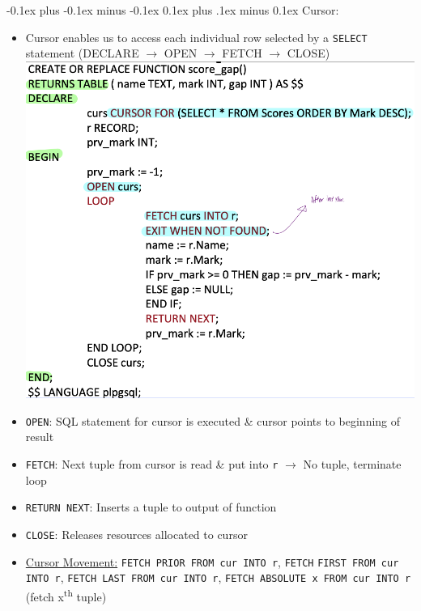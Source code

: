 \documentclass[landscape]{article}
\makeatletter
\renewcommand{\subsection}{\@startsection{subsection}{2}{0mm}%
  {-0.1ex plus -0.1ex minus -0.1ex}%
  {0.1ex plus .1ex minus 0.1ex}%
{\normalfont\scriptsize\bfseries}}
\makeatother
\begin{document}
\begin{multicols*}{5}
    \subsection{Cursor:}
    \begin{itemize}
      \item Cursor enables us to access each individual row selected by a \verb|SELECT| statement (DECLARE $\rightarrow$ OPEN $\rightarrow$ FETCH $\rightarrow$ CLOSE)
      \includegraphics[width=0.7\linewidth]{19_cursor.png}
      \item \verb|OPEN|: SQL statement for cursor is executed \& cursor points to beginning of result
      \item \verb|FETCH|: Next tuple from cursor is read \& put into \verb|r| $\rightarrow$ No tuple, terminate loop
      \item \verb|RETURN NEXT|: Inserts a tuple to output of function
      \item \verb|CLOSE|: Releases resources allocated to cursor
      \item \underline{Cursor Movement:} \verb|FETCH PRIOR FROM cur INTO r|, \verb|FETCH| \verb|FIRST FROM cur INTO r|, \verb|FETCH LAST FROM cur INTO r|, \verb|FETCH ABSOLUTE x FROM cur INTO r| (fetch x\textsuperscript{th} tuple)
    \end{itemize}
  \end{multicols*}
\end{document}
